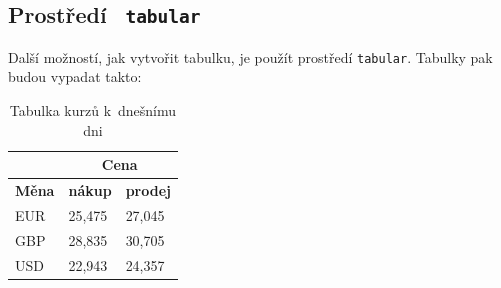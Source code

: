 \documentclass[a4paper, 11pt]{article}
\begin{document}
\subsection{Prostředí \texttt{ tabular}}
Další možností, jak vytvořit tabulku, je použít prostředí \verb|tabular|. Tabulky pak budou vypadat takto\footnotemark :
\bigskip
\begin{table}[h]
\centering
\begin{tabular}{|l|l|l|}
	\hline	& \multicolumn{2}{c|}{\textbf{Cena}} \\ \hline
	\textbf{Měna} & \textbf{nákup}       & \textbf{prodej}      \\ \hline
	EUR  & 25,475      & 27,045      \\
	GBP  & 28,835      & 30,705      \\
	USD  & 22,943      & 24,357      \\ \hline
\end{tabular}
\caption{Tabulka kurzů k~dnešnímu dni}
\label{table:kurzy}
\end{table}
\bigskip
\end{document}
